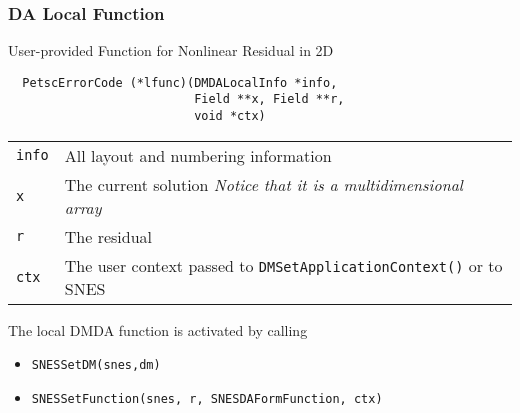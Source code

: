 \begin{frame}[fragile]
\frametitle{DA Local Function}

\begin{block}{User-provided Function for Nonlinear Residual in 2D}
\begin{lstlisting}
  PetscErrorCode (*lfunc)(DMDALocalInfo *info,
                          Field **x, Field **r,
                          void *ctx)
\end{lstlisting}

\begin{tabular}{lp{8.3cm}}
  \lstinline|info| & All layout and numbering information \\
  \lstinline|x|    & The current solution \newline
     \emph{ Notice that it is a multidimensional array} \\
  \lstinline|r|    & The residual \\
  \lstinline|ctx|  & The user context passed to \lstinline|DMSetApplicationContext()| or to SNES \\
\end{tabular}


\bigskip

The local DMDA function is activated by calling
\begin{itemize}
 \item \lstinline|SNESSetDM(snes,dm)|
 \item \lstinline|SNESSetFunction(snes, r, SNESDAFormFunction, ctx)|
\end{itemize}
\end{block}
\end{frame}

